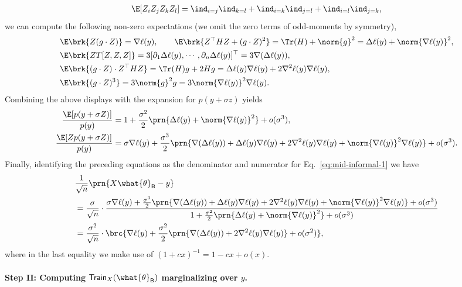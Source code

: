 \documentclass[11pt]{article}
\newcommand{\bysest}{\what{\theta}_{\mathsf{B}}}
\newcommand{\trerr}{\mathsf{Train}}
\begin{document}
\begin{align*}
    \E[Z_iZ_jZ_kZ_l] = \ind_{i=j} \ind_{k=l} + \ind_{i=k} \ind_{j=l} + \ind_{i=l} \ind_{j=k},
\end{align*}
we can compute the following non-zero expectations (we omit the zero terms of odd-moments by symmetry),
\begin{align*}
    &\E \brk{Z (g \cdot Z)} = \nabla \ell(y), \qquad \E \brk{Z^\top H Z + (g \cdot Z)^2} = \Tr (H) + \norm{g}^2 = \Delta \ell(y) + \norm{\nabla \ell(y)}^2, \\
    &\E \brk{Z T[Z, Z, Z]} = 3 [\partial_1 \Delta \ell(y), \cdots, \partial_n \Delta \ell(y)]^\top = 3\nabla (\Delta \ell(y)), \\
    & \E \brk{(g \cdot Z) \cdot Z^\top HZ} = \Tr(H)g + 2Hg = \Delta \ell(y) \nabla \ell(y) + 2\nabla^2 \ell(y) \nabla \ell(y), \\
    & \E \brk{(g \cdot Z)^3} = 3 \norm{g}^2 g = 3 \norm{\nabla \ell(y)}^2 \nabla \ell(y).
\end{align*}
Combining the above displays with the expansion for $p(y+\sigma z)$ yields
\begin{align*}
    \frac{\E[p(y+\sigma Z)]}{p(y)} & =  1 + \frac{\sigma^2}{2} \prn{\Delta \ell (y) + \norm{\nabla \ell (y)}^2} + o(\sigma^3), \\
    \frac{\E[Zp(y+\sigma Z)]}{p(y)} & = \sigma \nabla \ell (y) + \frac{\sigma^3}{2} \prn{\nabla (\Delta \ell(y)) + \Delta \ell(y) \nabla \ell(y) + 2\nabla^2 \ell(y) \nabla \ell(y) + \norm{\nabla \ell(y)}^2 \nabla \ell(y) } + o(\sigma^3).
\end{align*}
Finally, identifying the preceding equations as the denominator and numerator for Eq.~\eqref{eq:mid-informal-1} we have
\begin{align*}
    &\frac{1}{\sqrt{n}} \prn{X\bysest - y} \\
    & = \frac{\sigma}{\sqrt{n}}\cdot \frac{\sigma \nabla \ell (y) + \frac{\sigma^3}{2} \prn{\nabla (\Delta \ell(y)) + \Delta \ell(y) \nabla \ell(y) + 2\nabla^2 \ell(y) \nabla \ell(y) + \norm{\nabla \ell(y)}^2 \nabla \ell(y) } + o(\sigma^3)}{1 + \frac{\sigma^2}{2} \prn{\Delta \ell (y) + \norm{\nabla \ell (y)}^2} + o(\sigma^3)} \nonumber \\
    & = \frac{\sigma^2}{\sqrt{n}}\cdot \brc{\nabla \ell(y) + \frac{\sigma^2}{2} \prn{\nabla (\Delta \ell(y)) + 2\nabla^2 \ell(y) \nabla \ell(y) } + o(\sigma^2)},
\end{align*}
where in the last equality we make use of $(1+cx)^{-1}=1-cx+o(x)$.
\paragraph{Step II: Computing $\trerr_X(\bysest)$ marginalizing over $y$.}
\end{document}
